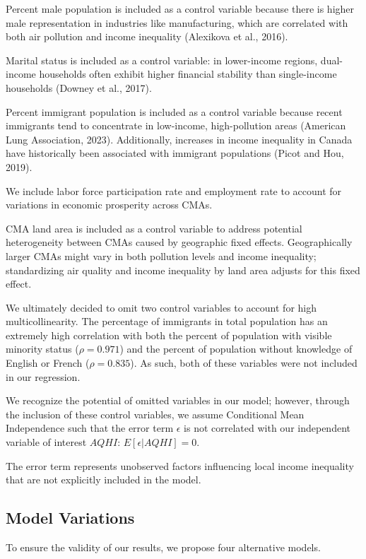\documentclass[AEJ]{AEA}
\begin{document}
Percent male population is included as a control variable because there is higher male representation in industries
like manufacturing, which are correlated with both air pollution and income
inequality (Alexikova et al., 2016). 

Marital status is included as a control variable: in lower-income regions, dual-income households
often exhibit higher financial stability than single-income households (Downey et
al., 2017). 

Percent immigrant population is included as a control variable because
recent immigrants tend to concentrate in low-income, high-pollution areas
(American Lung Association, 2023). Additionally, increases in income inequality
in Canada have historically been associated with immigrant populations (Picot and Hou, 2019).

We include labor force participation rate and employment rate to account for variations
in economic prosperity across CMAs.

CMA land area is included as a control variable to address potential heterogeneity
between CMAs caused by geographic fixed effects.
Geographically larger CMAs 
might vary in both pollution levels and income inequality; standardizing air quality 
and income inequality by land area adjusts for this fixed effect.

We ultimately decided to
omit two control variables to account for high multicollinearity. 
The percentage of immigrants in total population
has an extremely high correlation with both the percent of population with visible 
minority status ($\rho = 0.971$) and the percent of population without knowledge
of English or French ($\rho = 0.835$). As such, both of these variables
were not included in our regression.

We recognize the potential of omitted variables in our model; however, through
the inclusion of these control variables, we assume Conditional Mean Independence
such that the error term $\epsilon$ is not correlated with our independent variable
of interest $AQHI$: $E[\epsilon | AQHI] = 0$.

The error term represents unobserved factors influencing local income inequality
that are not explicitly included in the model.

\subsection{Model Variations}

To ensure the validity of our results, we propose four alternative models.
\end{document}
